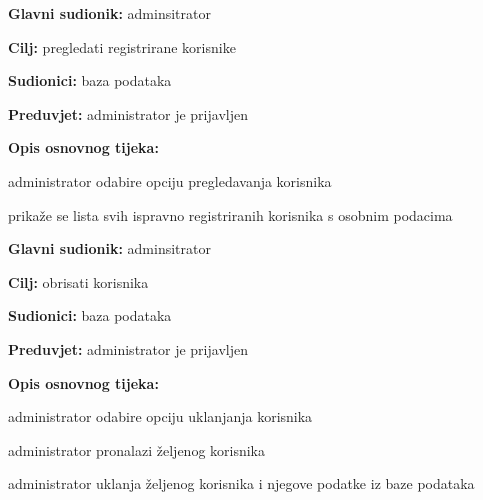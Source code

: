                     
                    \noindent {}
					\begin{packed_item}
	
						\item \textbf{Glavni sudionik: }adminsitrator
						\item  \textbf{Cilj:} pregledati registrirane korisnike
						\item  \textbf{Sudionici:} baza podataka
						\item  \textbf{Preduvjet:} administrator je prijavljen
						\item  \textbf{Opis osnovnog tijeka:}
						
						\item[] \begin{packed_enum}
	
							\item administrator odabire opciju pregledavanja korisnika
							\item prikaže se lista svih ispravno registriranih korisnika s osobnim podacima

						\end{packed_enum}
					\end{packed_item}

                    \noindent {}
					\begin{packed_item}
	
						\item \textbf{Glavni sudionik: }adminsitrator
						\item  \textbf{Cilj:} obrisati korisnika
						\item  \textbf{Sudionici:} baza podataka
						\item  \textbf{Preduvjet:} administrator je prijavljen
						\item  \textbf{Opis osnovnog tijeka:}
						
						\item[] \begin{packed_enum}
	
							\item administrator odabire opciju uklanjanja korisnika
							\item administrator pronalazi željenog korisnika
                            \item administrator uklanja željenog korisnika i njegove podatke iz baze podataka

						\end{packed_enum}
					\end{packed_item}

